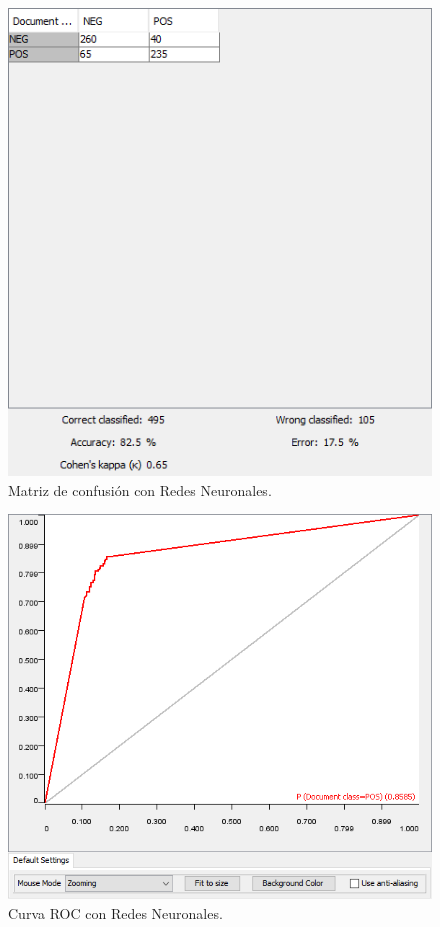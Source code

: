 \begin{figure}[H]
    \center\includegraphics[width=.95\linewidth]{img/classification/cmNN.png}
    \caption{Matriz de confusión con Redes Neuronales.}
\end{figure}

\begin{figure}[H]
    \center\includegraphics[width=.95\linewidth]{img/classification/rocNN.png}
    \caption{Curva ROC con Redes Neuronales.}
\end{figure}

